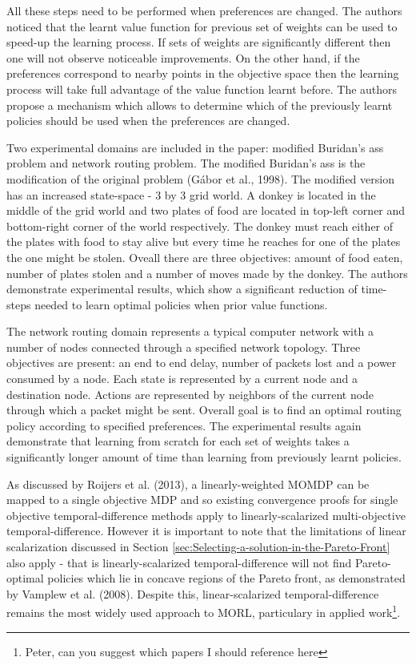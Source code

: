 All these steps need to be performed when preferences are changed. The authors noticed that the learnt value function for previous set of weights can be used to speed-up the learning process. If sets of weights are significantly different then one will not observe noticeable improvements. On the other hand, if the preferences correspond to nearby points in the objective space then the learning process will take full advantage of the value function learnt before. The authors propose a mechanism which allows to determine which of the previously learnt policies should be used when the preferences are changed.

Two experimental domains are included in the paper: modified Buridan's ass problem and network routing problem. The modified Buridan's ass is the modification of the original problem (G{\'a}bor et al., 1998\nocite{gabor1998multi}). The modified version has an increased state-space - 3 by 3 grid world. A donkey is located in the middle of the grid world and two plates of food are located in top-left corner and bottom-right corner of the world respectively. The donkey must reach either of the plates with food to stay alive but every time he reaches for one of the plates the one might be stolen. Oveall there are three objectives: amount of food eaten, number of plates stolen and a number of moves made by the donkey. The authors demonstrate experimental results, which show a significant reduction of time-steps needed to learn optimal policies when prior value functions.

The network routing domain represents a typical computer network with a number of nodes connected through a specified network topology. Three objectives are present: an end to end delay, number of packets lost and a power consumed by a node. Each state is represented by a current node and a destination node. Actions are represented by neighbors of the current node through which a packet might be sent. Overall goal is to find an optimal routing policy according to specified preferences. The experimental results again demonstrate that learning from scratch for each set of weights takes a significantly longer amount of time than learning from previously learnt policies.

As discussed by Roijers et al. (2013)\nocite{roijers2013survey}, a linearly-weighted MOMDP can be mapped to a single objective MDP and so existing convergence proofs for single objective temporal-difference methods apply to linearly-scalarized multi-objective temporal-difference. However it is important to note that the limitations of linear scalarization discussed in Section \ref{sec:Selecting-a-solution-in-the-Pareto-Front} also apply - that is linearly-scalarized temporal-difference will not find Pareto-optimal policies which lie in concave regions of the Pareto front, as demonstrated by Vamplew et al. (2008)\nocite{vamplew2008limitations}. Despite this, linear-scalarized temporal-difference remains the most widely used approach to MORL, particulary in applied work\footnote{Peter, can you suggest which papers I should reference here}.

